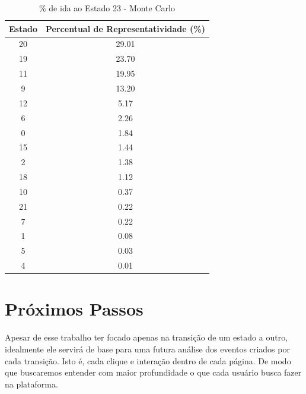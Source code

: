 \begin{table}[h]
\centering
\begin{tabular}{cc}
\hline
Estado & Percentual de Representatividade (\%) \\ \hline
20     & 29.01                                \\
19     & 23.70                                \\
11     & 19.95                                \\
9      & 13.20                                \\
12     & 5.17                                 \\
6      & 2.26                                 \\
0      & 1.84                                 \\
15     & 1.44                                 \\
2      & 1.38                                 \\
18     & 1.12                                 \\
10     & 0.37                                 \\
21     & 0.22                                 \\
7      & 0.22                                 \\
1      & 0.08                                 \\
5      & 0.03                                 \\
4      & 0.01                                 \\ \hline
\end{tabular}
\caption{\% de ida ao Estado 23 - Monte Carlo}
\label{tab:montecarlo}
\end{table}

\section{Próximos Passos}
Apesar de esse trabalho ter focado apenas na transição de um estado a outro, idealmente ele servirá de base para uma futura análise dos eventos criados por cada transição. Isto é, cada clique e interação dentro de cada página. De modo que buscaremos entender com maior profundidade o que cada usuário busca fazer na plataforma.  

\printbibliography[keyword = {markov}]
